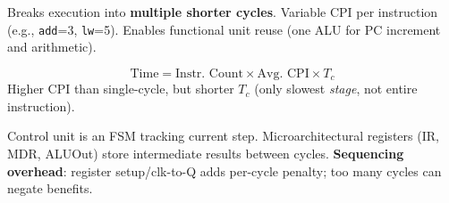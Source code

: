 \begin{definition}
	Breaks execution into \textbf{multiple shorter cycles}. Variable CPI per instruction (e.g., \texttt{add}=3, \texttt{lw}=5). Enables functional unit reuse (one ALU for PC increment and arithmetic).
\end{definition}

\begin{theorem}
	$$\text{Time} = \text{Instr. Count} \times \text{Avg. CPI} \times T_c$$
	Higher CPI than single-cycle, but shorter $T_c$ (only slowest \textit{stage}, not entire instruction).
\end{theorem}

\begin{remark}
	Control unit is an FSM tracking current step. Microarchitectural registers (IR, MDR, ALUOut) store intermediate results between cycles. \textbf{Sequencing overhead}: register setup/clk-to-Q adds per-cycle penalty; too many cycles can negate benefits.
\end{remark}
